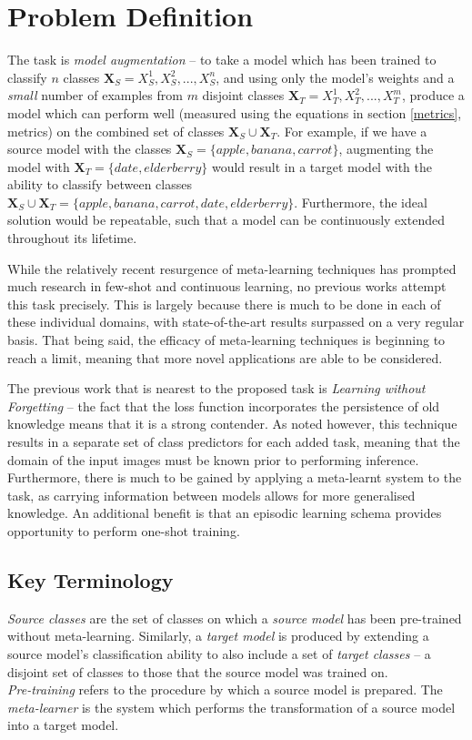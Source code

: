\documentclass{report}
\begin{document}
\chapter{Problem Definition} \label{problem-definition}
The task is \textit{model augmentation} -- to take a model which has been trained to classify $n$ classes $\bm{X}_S = {X_S^1, X_S^2, ..., X_S^n}$, and using only the model's weights and a \emph{small} number of examples from $m$ disjoint classes $\bm{X}_T = {X_T^1, X_T^2, ..., X_T^m}$, produce a model which can perform well (measured using the equations in section \ref{metrics}, metrics) on the combined set of classes $\bm{X}_S \cup \bm{X}_T$. For example, if we have a source model with the classes $\bm{X}_S = \lbrace apple, banana, carrot \rbrace$, augmenting the model with $\bm{X}_T = \lbrace date, elderberry \rbrace$ would result in a target model with the ability to classify between classes $\bm{X}_S \cup \bm{X}_T = \lbrace apple, banana, carrot, date, elderberry \rbrace$.
Furthermore, the ideal solution would be repeatable, such that a model can be continuously extended throughout its lifetime. \par
While the relatively recent resurgence of meta-learning techniques has prompted much research in few-shot and continuous learning, no previous works attempt this task precisely. This is largely because there is much to be done in each of these individual domains, with state-of-the-art results surpassed on a very regular basis. That being said, the efficacy of meta-learning techniques is beginning to reach a limit, meaning that more novel applications are able to be considered.	\par
The previous work that is nearest to the proposed task is \textit{Learning without Forgetting}\parencite{lwf} -- the fact that the loss function incorporates the persistence of old knowledge means that it is a strong contender. As noted however, this technique results in a separate set of class predictors for each added task, meaning that the domain of the input images must be known prior to performing inference. Furthermore, there is much to be gained by applying a meta-learnt system to the task, as carrying information between models allows for more generalised knowledge. An additional benefit is that an episodic learning schema provides opportunity to perform one-shot training. \par

\section{Key Terminology}
\textit{Source classes} are the set of classes on which a \textit{source model} has been pre-trained without meta-learning. Similarly, a \textit{target model} is produced by extending a source model's classification ability to also include a set of \textit{target classes} -- a disjoint set of classes to those that the source model was trained on. \\
\textit{Pre-training} refers to the procedure by which a source model is prepared. The \textit{meta-learner} is the system which performs the transformation of a source model into a target model.
\end{document}
